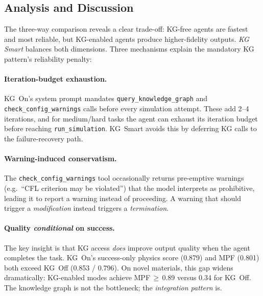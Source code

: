 \documentclass[preprint,review,12pt]{elsarticle}
\begin{document}
\subsection{Analysis and Discussion}
\label{sec:ablation-disc}

The three-way comparison reveals a clear trade-off: KG-free agents are
fastest and most reliable, but KG-enabled agents produce higher-fidelity
outputs.  \emph{KG Smart} balances both dimensions.  Three mechanisms
explain the mandatory KG pattern's reliability penalty:

\paragraph{Iteration-budget exhaustion.}
KG~On's system prompt mandates \texttt{query\_knowledge\_graph} and
\texttt{check\_config\_warnings} calls before every simulation attempt.
These add 2--4 iterations, and for medium/hard tasks the agent can
exhaust its iteration budget before reaching \texttt{run\_simulation}.
KG~Smart avoids this by deferring KG calls to the failure-recovery path.

\paragraph{Warning-induced conservatism.}
The \texttt{check\_config\_warnings} tool occasionally returns pre-emptive
warnings (e.g.\ ``CFL criterion may be violated'') that the model
interprets as prohibitive, leading it to report a warning instead of
proceeding.  A warning that should trigger a \emph{modification}
instead triggers a \emph{termination}.

\paragraph{Quality \emph{conditional} on success.}
The key insight is that KG access \emph{does} improve output quality
when the agent completes the task.  KG~On's success-only physics score
(0.879) and MPF (0.801) both exceed KG~Off (0.853 / 0.796).  On novel
materials, this gap widens dramatically: KG-enabled modes achieve
MPF\,$\geq$\,0.89 versus 0.34 for KG~Off.  The knowledge graph is not
the bottleneck; the \emph{integration pattern} is.
\end{document}
